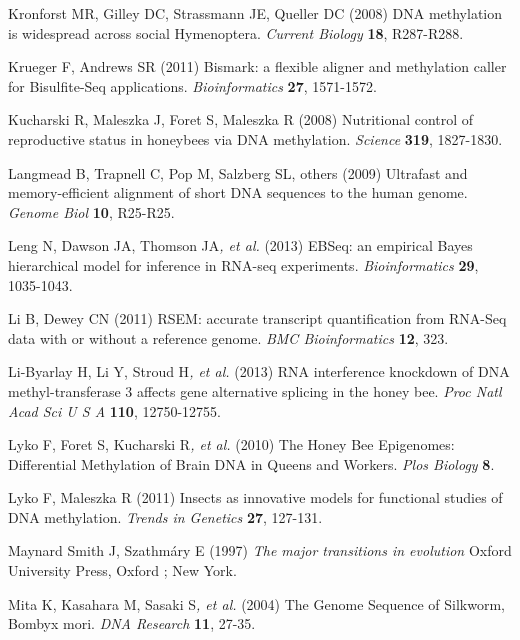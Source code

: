 \documentclass[]{article}
\begin{document}
\protect\hypertarget{ux5fENREFux5f26}{}{}Kronforst MR, Gilley DC,
Strassmann JE, Queller DC (2008) DNA methylation is widespread across
social Hymenoptera. \emph{Current Biology} \textbf{18}, R287-R288.

\protect\hypertarget{ux5fENREFux5f27}{}{}Krueger F, Andrews SR (2011)
Bismark: a flexible aligner and methylation caller for Bisulfite-Seq
applications. \emph{Bioinformatics} \textbf{27}, 1571-1572.

\protect\hypertarget{ux5fENREFux5f28}{}{}Kucharski R, Maleszka J, Foret
S, Maleszka R (2008) Nutritional control of reproductive status in
honeybees via DNA methylation. \emph{Science} \textbf{319}, 1827-1830.

\protect\hypertarget{ux5fENREFux5f29}{}{}Langmead B, Trapnell C, Pop M,
Salzberg SL, others (2009) Ultrafast and memory-efficient alignment of
short DNA sequences to the human genome. \emph{Genome Biol} \textbf{10},
R25-R25.

\protect\hypertarget{ux5fENREFux5f30}{}{}Leng N, Dawson JA, Thomson
JA\emph{, et al.} (2013) EBSeq: an empirical Bayes hierarchical model
for inference in RNA-seq experiments. \emph{Bioinformatics} \textbf{29},
1035-1043.

\protect\hypertarget{ux5fENREFux5f31}{}{}Li B, Dewey CN (2011) RSEM:
accurate transcript quantification from RNA-Seq data with or without a
reference genome. \emph{BMC Bioinformatics} \textbf{12}, 323.

\protect\hypertarget{ux5fENREFux5f32}{}{}Li-Byarlay H, Li Y, Stroud
H\emph{, et al.} (2013) RNA interference knockdown of DNA
methyl-transferase 3 affects gene alternative splicing in the honey bee.
\emph{Proc Natl Acad Sci U S A} \textbf{110}, 12750-12755.

\protect\hypertarget{ux5fENREFux5f33}{}{}Lyko F, Foret S, Kucharski
R\emph{, et al.} (2010) The Honey Bee Epigenomes: Differential
Methylation of Brain DNA in Queens and Workers. \emph{Plos Biology}
\textbf{8}.

\protect\hypertarget{ux5fENREFux5f34}{}{}Lyko F, Maleszka R (2011)
Insects as innovative models for functional studies of DNA methylation.
\emph{Trends in Genetics} \textbf{27}, 127-131.

\protect\hypertarget{ux5fENREFux5f35}{}{}Maynard Smith J, Szathmáry E
(1997) \emph{The major transitions in evolution} Oxford University
Press, Oxford ; New York.

\protect\hypertarget{ux5fENREFux5f36}{}{}Mita K, Kasahara M, Sasaki
S\emph{, et al.} (2004) The Genome Sequence of Silkworm, Bombyx mori.
\emph{DNA Research} \textbf{11}, 27-35.
\end{document}
